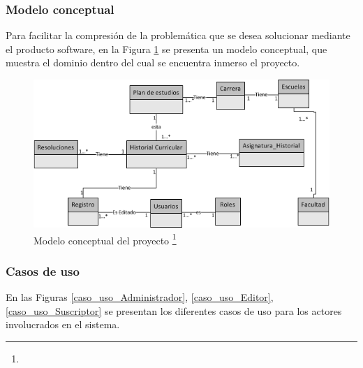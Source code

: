 	\subsubsection{Modelo conceptual}
	Para facilitar la compresión de la problemática que se desea solucionar mediante el producto software, en la Figura \ref{Figura_Modelo_conceptual}  se presenta un modelo conceptual, que muestra el dominio dentro del cual se encuentra inmerso el proyecto.
	\\
		\begin{figure}[H]
			\centering
			\includegraphics[width=1\textwidth]{images/Capitulo_3/Modelo_Conceptual.png}
			\caption[Modelo conceptual del proyecto]{Modelo conceptual del proyecto \footnote{}}
			\label{Figura_Modelo_conceptual}
		\end{figure}
	\subsubsection{Casos de uso}
	En las Figuras \ref{caso_uso_Administrador}, \ref{caso_uso_Editor}, \ref{caso_uso_Suscriptor} se presentan los diferentes casos de uso para los actores
	involucrados en el sistema.
	
